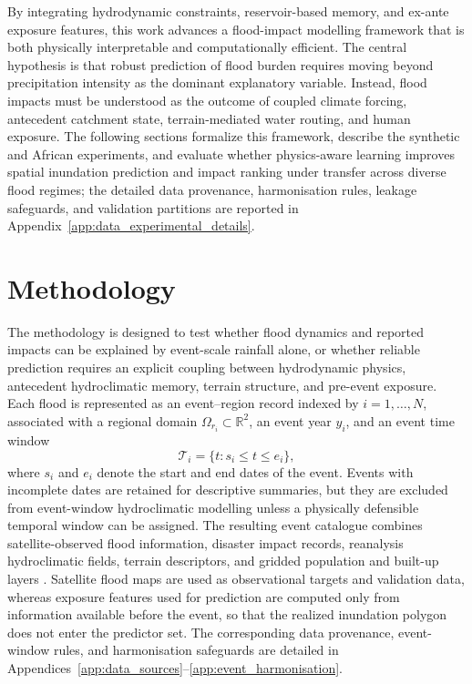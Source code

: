 \documentclass[pdflatex,sn-mathphys-ay]{sn-jnl}
\theoremstyle{thmstyleone}
\begin{document}
By integrating hydrodynamic constraints, reservoir-based memory, and
ex-ante exposure features, this work advances a flood-impact modelling
framework that is both physically interpretable and computationally
efficient.  The central hypothesis is that robust prediction of flood
burden requires moving beyond precipitation intensity as the dominant
explanatory variable.  Instead, flood impacts must be understood as the
outcome of coupled climate forcing, antecedent catchment state,
terrain-mediated water routing, and human exposure.  The following
sections formalize this framework, describe the synthetic and African
experiments, and evaluate whether physics-aware learning improves
spatial inundation prediction and impact ranking under transfer across
diverse flood regimes; the detailed data provenance, harmonisation
rules, leakage safeguards, and validation partitions are reported in
Appendix~\ref{app:data_experimental_details}.

\section{Methodology}
\label{sec:methodology}

The methodology is designed to test whether flood dynamics and
reported impacts can be explained by event-scale rainfall alone, or
whether reliable prediction requires an explicit coupling between
hydrodynamic physics, antecedent hydroclimatic memory, terrain
structure, and pre-event exposure.  Each flood is represented as an
event--region record indexed by $i=1,\ldots,N$, associated with a
regional domain $\Omega_{r_i}\subset\mathbb{R}^{2}$, an event year
$y_i$, and an event time window
\begin{equation}
  \mathcal{T}_{i}
  =
  \{t:s_i\leq t\leq e_i\},
  \label{eq:event_window}
\end{equation}
where $s_i$ and $e_i$ denote the start and end dates of the event.
Events with incomplete dates are retained for descriptive summaries,
but they are excluded from event-window hydroclimatic modelling unless
a physically defensible temporal window can be assigned.  The resulting
event catalogue combines satellite-observed flood information, disaster
impact records, reanalysis hydroclimatic fields, terrain descriptors,
and gridded population and built-up layers
\citep{EMDAT2024,Tellman2021,Stevens2015,Pesaresi2023,Hersbach2020}.  Satellite flood maps are
used as observational targets and validation data, whereas exposure
features used for prediction are computed only from information
available before the event, so that the realized inundation polygon does
not enter the predictor set.  The corresponding data provenance,
event-window rules, and harmonisation safeguards are detailed in
Appendices~\ref{app:data_sources}--\ref{app:event_harmonisation}.
\end{document}
